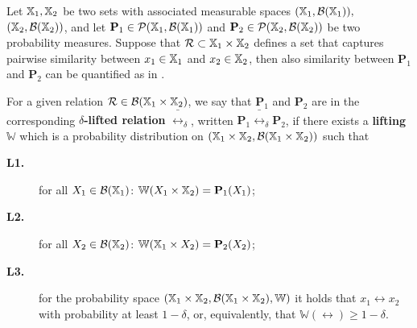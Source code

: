 \documentclass{ifacconf}
\begin{document}
Let ${\mathbb{X}}_1,{\mathbb{X}}_2$ be two sets with associated measurable spaces $({\mathbb{X}}_1,\mathcal B({\mathbb{X}}_1)),$ $({\mathbb{X}}_2,\mathcal B({\mathbb{X}}_2))$, and let $\mathbf{P}_1 \in \mathcal{P}({\mathbb{X}}_1,\mathcal B({\mathbb{X}}_1)) $ and $\mathbf{P}_2 \in \mathcal{P}({\mathbb{X}}_2,\mathcal B({\mathbb{X}}_2)) $ be two probability measures. Suppose that $\mathcal{R} \subset {\mathbb{X}}_1 \times {\mathbb{X}}_2$ defines a set that captures pairwise similarity between $x_1 \in {\mathbb{X}}_1$ and $x_2 \in {\mathbb{X}}_2$, then also similarity between $\mathbf{P}_1$ and $\mathbf{P}_2$ can be quantified as in \cite{haesaert2017verification}.
%
\begin{definition}
\label{def:dellifting}
  For a given relation $\mathcal{R}\in \mathcal B({\mathbb{X}}_1\times {\mathbb{X}}_2)$, we say that  $\mathbf{P}_1$ and $\mathbf{P}_2$ are in the corresponding \textbf{$\delta$-lifted relation} $\bar \rel_\delta$, written $\mathbf{P}_1 \bar \rel_\delta \mathbf{P}_2$, if there exists a \textbf{lifting} $\mathbb{W}$ which is a probability distribution on $({\mathbb{X}}_1\times {\mathbb{X}}_2,\mathcal B({\mathbb{X}}_1\times {\mathbb{X}}_2))$ such that { \setlength{\parskip}{-1pt}\setlength{\parsep}{0pt}
		\begin{description}
			\item[\textbf{L1.}] for all $X_1\in \mathcal{B}({\mathbb{X}}_1)$: $\mathbb W(X_1\times {\mathbb{X}}_2)=\mathbf{P}_1(X_1)$;
			\item [\textbf{L2.}] for all $X_2\in \mathcal{B}({\mathbb{X}}_2)$:  $\mathbb W({\mathbb{X}}_1\times X_2)=\mathbf{P}_2(X_2)$;
			\item[\textbf{L3.}] for the probability space  $({\mathbb{X}}_1\times {\mathbb{X}}_2,\mathcal B({\mathbb{X}}_1\times {\mathbb{X}}_2), \mathbb W)$ it holds that
			$x_1\rel x_2$ with probability at least $1-\delta$, or, equivalently, that $\mathbb{W}\left(\rel\right)\geq1-\delta$.
	\end{description}}
\end{definition}
\end{document}
